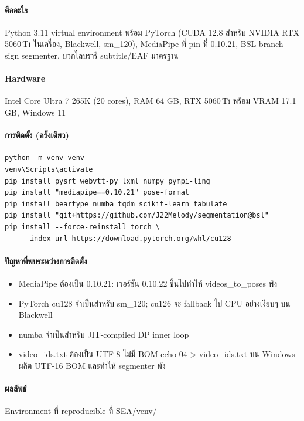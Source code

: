 \documentclass[11pt,a4paper]{article}
\def\texttt#1{#1}%
\def\textbf#1{#1}%
\begin{document}
\paragraph{คืออะไร}
Python 3.11 virtual environment พร้อม PyTorch (CUDA 12.8
สำหรับ NVIDIA RTX 5060\,Ti ในเครื่อง, Blackwell, sm\_120),
MediaPipe ที่ pin ที่ \texttt{0.10.21}, BSL-branch sign segmenter,
บวกไลบรารี subtitle/EAF มาตรฐาน

\paragraph{Hardware} Intel Core Ultra 7 265K (20 cores), RAM 64 GB,
RTX 5060\,Ti พร้อม VRAM 17.1 GB, Windows 11

\paragraph{การติดตั้ง (ครั้งเดียว)}
\begin{lstlisting}
python -m venv venv
venv\Scripts\activate
pip install pysrt webvtt-py lxml numpy pympi-ling
pip install "mediapipe==0.10.21" pose-format
pip install beartype numba tqdm scikit-learn tabulate
pip install "git+https://github.com/J22Melody/segmentation@bsl"
pip install --force-reinstall torch \
    --index-url https://download.pytorch.org/whl/cu128
\end{lstlisting}

\paragraph{ปัญหาที่พบระหว่างการติดตั้ง}
\begin{itemize}[leftmargin=1.5em]
  \item \textbf{MediaPipe ต้องเป็น 0.10.21}: เวอร์ชัน 0.10.22 ขึ้นไปทำให้
        \texttt{videos\_to\_poses} พัง
  \item \textbf{PyTorch \texttt{cu128}} จำเป็นสำหรับ sm\_120; cu126
        จะ fallback ไป CPU อย่างเงียบๆ บน Blackwell
  \item \texttt{numba} จำเป็นสำหรับ JIT-compiled DP inner loop
  \item \texttt{video\_ids.txt} ต้องเป็น UTF-8 ไม่มี BOM
        \texttt{echo 04 > video\_ids.txt} บน Windows ผลิต UTF-16 BOM
        และทำให้ segmenter พัง
\end{itemize}

\paragraph{ผลลัพธ์} Environment ที่ reproducible ที่ \texttt{SEA/venv/}
\end{document}
